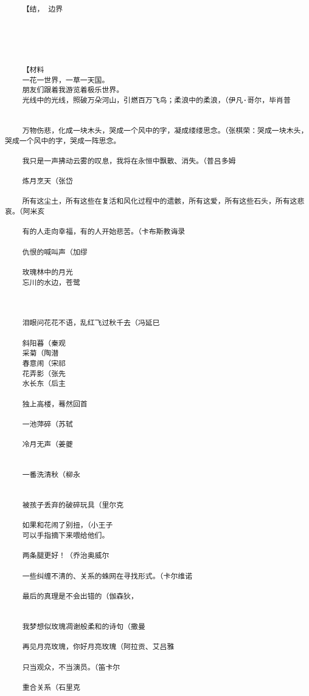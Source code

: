 \documentclass[UTF8]{Diaries}
\begin{document}
\begin{lstlisting}
    【结， 边界





    【材料
    一花一世界，一草一天国。
    朋友们跟着我游览着极乐世界。
    光线中的光线，照破万朵河山，引燃百万飞鸟；柔浪中的柔浪，（伊凡·哥尔，毕肖普
    
  
    万物伤悲，化成一块木头，哭成一个风中的字，凝成缕缕思念。（张棋荣：哭成一块木头，哭成一个风中的字，哭成一阵思念。

    我只是一声拂动云雾的叹息，我将在永恒中飘散、消失。（普吕多姆

    炼月烹天（张岱
    
    所有这尘土，所有这些在复活和风化过程中的遗骸，所有这爱，所有这些石头，所有这悲哀。（阿米亥
    
    有的人走向幸福，有的人开始悲苦。（卡布斯教诲录
    
    仇恨的喊叫声（加缪
    
    玫瑰林中的月光
    忘川的水边，苍鹭
    
    
    
    泪眼问花花不语，乱红飞过秋千去（冯延巳
    
    斜阳暮（秦观
    采菊（陶潜
    春意闹（宋祁
    花弄影（张先
    水长东（后主
    
    独上高楼，蓦然回首
    
    一池萍碎（苏轼
    
    冷月无声（姜夔
    
    
    一番洗清秋（柳永
    
    
    被孩子丢弃的破碎玩具（里尔克
    
    如果和花闹了别扭，（小王子
    可以手指摘下来喂给他们。
    
    两条腿更好！（乔治奥威尔
    
    一些纠缠不清的、关系的蛛网在寻找形式。（卡尔维诺
    
    最后的真理是不会出错的（伽森狄，
    
    
    我梦想似玫瑰凋谢般柔和的诗句（撒曼
    
    再见月亮玫瑰，你好月亮玫瑰（阿拉贡、艾吕雅
    
    只当观众，不当演员。（笛卡尔
    
    重合关系（石里克
    
    
    
    
    



    
\end{lstlisting}
\end{document}
